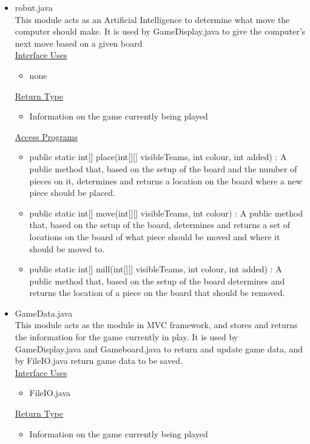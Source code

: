 \documentclass[12pt]{article}
\begin{document}
	\begin{itemize}
		\item robut.java \\
		This module acts as an Artificial Intelligence to determine what move the computer should make. It is used by GameDisplay.java to give the computer’s next move based on a given board  \\
		\underline{Interface Uses} 
		\begin{itemize}
			\item none
		\end{itemize} 
		\underline{Return Type}
		\begin{itemize}
			\item Information on the game currently being played
		\end{itemize}
		\underline{Access Programs}
		\begin{itemize}
			\item public static int[] place(int[][] visibleTeams, int colour, int added) : A public method that, based on the setup of the board and the number of pieces on it, determines and returns a location on the board where a new piece should be placed.
			\item public static int[] move(int[][] visibleTeams, int colour) : A public method that, based on the setup of the board, determines and returns a set of locations on the board of what piece should be moved and where it should be moved to.
			\item public static int[] mill(int[][] visibleTeams, int colour, int added) : A public method that, based on the setup of the board determines and returns the location of a piece on the board that should be removed.
		\end{itemize}
		\item GameData.java \\
		This module acts as the module in MVC framework, and stores and returns the information for the game currently in play. It is used by GameDisplay.java and Gameboard.java to return and update game data, and by FileIO.java return game data to be saved. \\
		\underline{Interface Uses} 
		\begin{itemize}
			\item FileIO.java
		\end{itemize} 
		\underline{Return Type}
		\begin{itemize}
			\item Information on the game currently being played
		\end{itemize}

\end{itemize}
\end{document}

